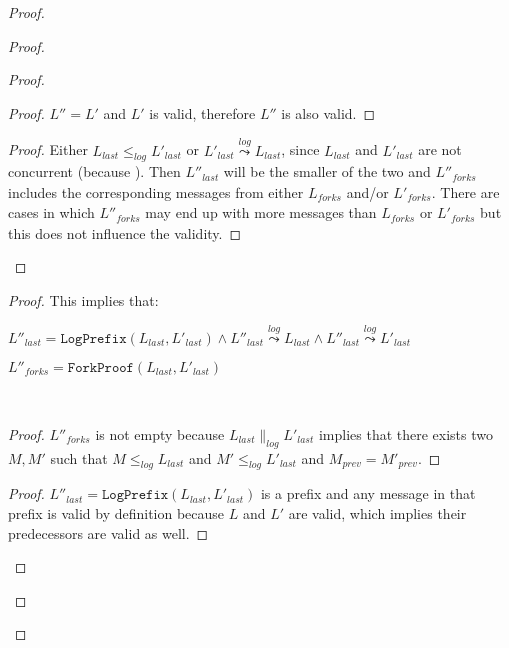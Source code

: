 \documentclass[9pt, oneside]{article}   	%
\newcommand{\logleadsto}{\overset{\textit{log}}\leadsto}
\begin{document}
\begin{proof}
\begin{proof}
\begin{proof}
			\begin{proof}
				$L'' = L'$ and $L'$ is valid, therefore $L''$ is also valid.
			\end{proof}
		
			\begin{proof}
				Either $L_\textit{last} \leq_\textit{log} L'_\textit{last}$ or $L'_\textit{last} \logleadsto L_\textit{last}$, since $L_\textit{last}$ and $L'_\textit{last}$ are not concurrent (because ). Then $L''_\textit{last}$ will be the smaller of the two and $L''_\textit{forks}$ includes the corresponding messages from either $L_\textit{forks}$ and/or $L'_\textit{forks}$. There are cases in which $L''_\textit{forks}$ may end up with more messages than $L_\textit{forks}$ or $L'_\textit{forks}$ but this does not influence the validity.
			\end{proof}
		\end{proof}

		
	
		\begin{proof}
			This implies that:
			\begin{pfenum}
				\item $L''_\textit{last} = \texttt{LogPrefix}(L_\textit{last},L'_\textit{last}) \wedge L''_\textit{last} \logleadsto L_\textit{last} \wedge  L''_\textit{last} \logleadsto L'_\textit{last}$
				\item $L''_\textit{forks} = \texttt{ForkProof}(L_\textit{last}, L'_\textit{last})$
			\end{pfenum}
			~\newline
			
			\begin{proof}
				$L''_\textit{forks}$ is not empty because $L_\textit{last} \parallel_\textit{log} L'_\textit{last}$ implies that there exists two $M,M'$ such that $M \leq_\textit{log} L_\textit{last}$ and $M' \leq_\textit{log} L'_\textit{last}$ and $M_\textit{prev} = M'_\textit{prev}$.
			\end{proof}
				
			\begin{proof}
					$L''_\textit{last} = \texttt{LogPrefix}(L_\textit{last},L'_\textit{last})$ is a prefix and any message in that prefix is valid by definition because $L$ and $L'$ are valid, which implies their predecessors are valid as well.
			\end{proof}
				

\end{proof}
\end{proof}
\end{proof}
\end{document}

